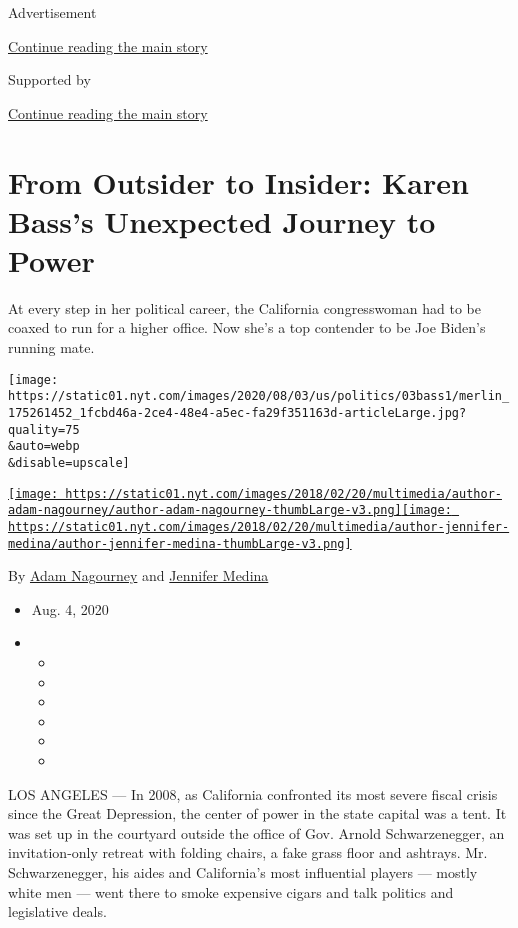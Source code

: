 Advertisement

\protect\hyperlink{after-top}{Continue reading the main story}

Supported by

\protect\hyperlink{after-sponsor}{Continue reading the main story}

\hypertarget{from-outsider-to-insider-karen-basss-unexpected-journey-to-power}{%
\section{From Outsider to Insider: Karen Bass's Unexpected Journey to
Power}\label{from-outsider-to-insider-karen-basss-unexpected-journey-to-power}}

At every step in her political career, the California congresswoman had
to be coaxed to run for a higher office. Now she's a top contender to be
Joe Biden's running mate.

\texttt{[image: https://static01.nyt.com/images/2020/08/03/us/politics/03bass1/merlin\_175261452\_1fcbd46a-2ce4-48e4-a5ec-fa29f351163d-articleLarge.jpg?quality=75\\\&auto=webp\\\&disable=upscale]}

\href{https://www.nytimes.com/by/adam-nagourney}{\texttt{[image: https://static01.nyt.com/images/2018/02/20/multimedia/author-adam-nagourney/author-adam-nagourney-thumbLarge-v3.png]}}\href{https://www.nytimes.com/by/jennifer-medina}{\texttt{[image: https://static01.nyt.com/images/2018/02/20/multimedia/author-jennifer-medina/author-jennifer-medina-thumbLarge-v3.png]}}

By \href{https://www.nytimes.com/by/adam-nagourney}{Adam Nagourney} and
\href{https://www.nytimes.com/by/jennifer-medina}{Jennifer Medina}

\begin{itemize}
\item
  Aug. 4, 2020
\item
  \begin{itemize}
  \item
  \item
  \item
  \item
  \item
  \item
  \end{itemize}
\end{itemize}

LOS ANGELES --- In 2008, as California confronted its most severe fiscal
crisis since the Great Depression, the center of power in the state
capital was a tent. It was set up in the courtyard outside the office of
Gov. Arnold Schwarzenegger, an invitation-only retreat with folding
chairs, a fake grass floor and ashtrays. Mr. Schwarzenegger, his aides
and California's most influential players --- mostly white men --- went
there to smoke expensive cigars and talk politics and legislative deals.

